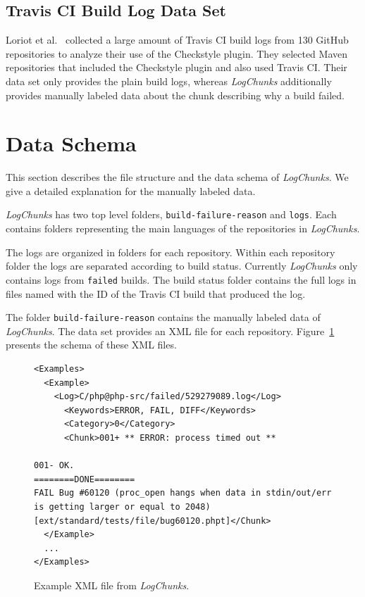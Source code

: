 \documentclass[\myrootdir/main.tex]{subfiles}
\begin{document}
\subsection{Travis CI Build Log Data Set}
Loriot et al.~\cite{loriot2019dataset, loriot2019styler} collected a large amount of Travis CI build logs from 130 GitHub repositories to analyze their use of the Checkstyle plugin.
They selected Maven repositories that included the Checkstyle plugin and also used Travis CI\@.
Their data set only provides the plain build logs, whereas \emph{LogChunks} additionally provides manually labeled data about the chunk describing why a build failed.

\section{Data Schema}
\label{sec:data-schema}
This section describes the file structure and the data schema of \emph{LogChunks}.
We give a detailed explanation for the manually labeled data.

\emph{LogChunks} has two top level folders, \texttt{build-failure-reason} and \texttt{logs}.
Each contains folders representing the main languages of the repositories in \emph{LogChunks}.

The logs are organized in folders for each repository.
Within each repository folder the logs are separated according to build status.
Currently \emph{LogChunks} only contains logs from \texttt{failed} builds.
The build status folder contains the full logs in files named with the ID of the Travis CI build that produced the log.

The folder \texttt{build-failure-reason} contains the manually labeled data of \emph{LogChunks}.
The data set provides an XML file for each repository.
Figure~\ref{lst:examples} presents the schema of these XML files.

\begin{figure}[]
	\centering
\begin{lstlisting}[breaklines=true]
<Examples>
  <Example>
    <Log>C/php@php-src/failed/529279089.log</Log>
      <Keywords>ERROR, FAIL, DIFF</Keywords>
      <Category>0</Category>
      <Chunk>001+ ** ERROR: process timed out **

001- OK.
========DONE========
FAIL Bug #60120 (proc_open hangs when data in stdin/out/err is getting larger or equal to 2048) [ext/standard/tests/file/bug60120.phpt]</Chunk>
  </Example>
  ...
</Examples>
\end{lstlisting}
	\caption{Example XML file from \emph{LogChunks}.}
	\label{lst:examples}
\end{figure}
\end{document}
